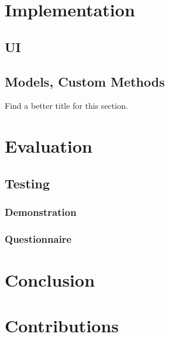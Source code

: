 \documentclass{l3proj}
\begin{document}
\chapter{Implementation}
\label{impl}

\section{UI}
\label{impl:ui}

\section{Models, Custom Methods}
\label{impl:models}
Find a better title for this section.

\chapter{Evaluation}
\label{eval}

\section{Testing}
\label{eval:testing}

\subsection{Demonstration}
\label{eval:demo}

\subsection{Questionnaire}
\label{eval:question}

\chapter{Conclusion}
\label{conc}

\chapter{Contributions}
\label{contribs}


\clearpage


\end{document}
